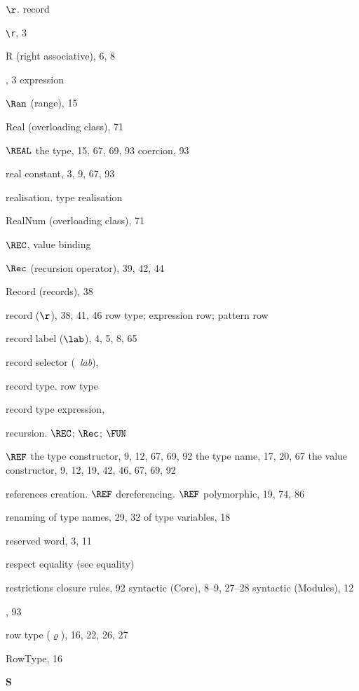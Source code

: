 \begin{theindex}
\item $\r$. \see record
\item \verb+\r+, 3
\item R (right associative), 6, 8
\item \RAISE, 3
\subitem \seealso expression
\item $\Ran$ (range), 15
\item Real (overloading class), 71
\item $\REAL$
\subitem the type, 15, 67, 69, 93
\subitem coercion, 93
\item real constant, 3, 9, 67, 93
\item realisation. \see type realisation
\item RealNum (overloading class), 71
\item $\REC$, \recrefs
\subitem \seealso value binding
\item $\Rec$ (recursion operator), 39, 42, 44
\item Record (records), 38
\item record ($\r$), 38, 41, 46
\subitem \seealso row type; expression row; pattern row
\item record label ($\lab$), 4, 5, 8, 65
\item record selector (\ml{\#}\ {\it lab}), \hashrefs
\item record type. \see row type
\item record type expression, \bracestyexprefs
\item recursion. \see $\REC$; $\Rec$; $\FUN$
\item $\REF$
\subitem the type constructor, 9, 12, 67, 69, 92
\subitem the type name, 17, 20, 67
\subitem the value constructor, 9, 12, 19, 42, 46, 67, 69, 92
\item references
\subitem creation. \see $\REF$
\subitem dereferencing. \see $\REF$
\subitem polymorphic, 19, 74, 86
\item renaming
\subitem of type names, 29, 32
\subitem of type variables, 18
\item reserved word, 3, 11
\item respect equality (see equality)
\item restrictions
\subitem closure rules, 92
\subitem syntactic (Core), 8--9, 27--28
\subitem syntactic (Modules), 12
\item {}, 93
\item row type ($\varrho$), 16, 22, 26, 27
\item RowType, 16
\indexspace

\parbox{65mm}{\hfil{\large\bf S}\hfil}


\end{theindex}
